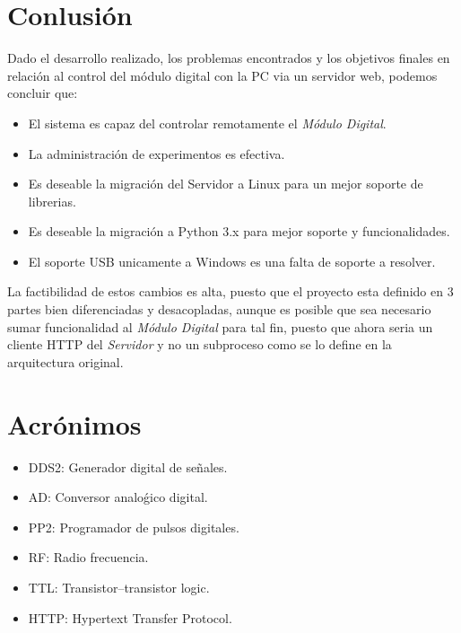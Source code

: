 \section{Conlusi\'on}

Dado el desarrollo realizado, los problemas encontrados y los objetivos finales en relaci\'on
al control del m\'odulo digital con la PC via un servidor web, podemos concluir que:

\begin{itemize}
    \item El sistema es capaz del controlar remotamente el \textit{M\'odulo Digital}.
    \item La administraci\'on de experimentos es efectiva.
    \item Es deseable la migraci\'on del Servidor a Linux para un mejor soporte de librerias.
    \item Es deseable la migraci\'on a Python 3.x para mejor soporte y funcionalidades.
    \item El soporte USB unicamente a Windows es una falta de soporte a resolver.
\end{itemize}

La factibilidad de estos cambios es alta, puesto que el proyecto esta definido en 3 partes
bien diferenciadas y desacopladas, aunque es posible que sea necesario sumar funcionalidad 
al \textit{M\'odulo Digital} para tal fin, puesto que ahora seria un cliente HTTP del \textit{Servidor} y
no un subproceso como se lo define en la arquitectura original.

\newpage

\section{Acr\'onimos}

\begin{itemize}
    \item DDS2: Generador digital de señales.
    \item AD: Conversor analo\'gico digital.
    \item PP2: Programador de pulsos digitales.
    \item RF: Radio frecuencia.
    \item TTL: Transistor–transistor logic.
    \item HTTP: Hypertext Transfer Protocol.
\end{itemize}

\newpage